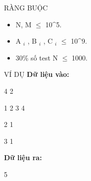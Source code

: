 RÀNG BUỘC
\begin{itemize}
	\item     N, M  $\le$  10^5.   
	\item     A    $_     i    $    , B    $_     i    $    , C    $_     i    $     $\le$  10^9.   
	\item     30\% số test N  $\le$  1000.   
\end{itemize}
VÍ DỤ
\textbf{    Dữ liệu vào:   }

   4 2  

   1 2 3 4  

   2 1  

   3 1  

\textbf{    Dữ liệu ra:   }

   5